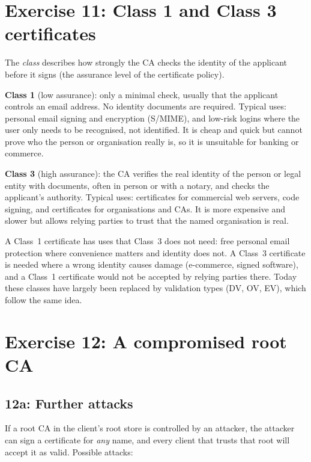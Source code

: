     \pagebreak

    \section{Exercise 11: Class 1 and Class 3 certificates}

        The \emph{class} describes how strongly the CA checks the identity of the applicant
        before it signs (the assurance level of the certificate policy).

        \textbf{Class 1} (low assurance): only a minimal check, usually that the applicant
        controls an email address. No identity documents are required. Typical uses:
        personal email signing and encryption (S/MIME), and low-risk logins where the user
        only needs to be recognised, not identified. It is cheap and quick but cannot prove
        who the person or organisation really is, so it is unsuitable for banking or commerce.

        \textbf{Class 3} (high assurance): the CA verifies the real identity of the person or
        legal entity with documents, often in person or with a notary, and checks the
        applicant's authority. Typical uses: certificates for commercial web servers, code
        signing, and certificates for organisations and CAs. It is more expensive and slower
        but allows relying parties to trust that the named organisation is real.

        A Class~1 certificate has uses that Class~3 does not need: free personal email
        protection where convenience matters and identity does not. A Class~3 certificate
        is needed where a wrong identity causes damage (e-commerce, signed software), and a
        Class~1 certificate would not be accepted by relying parties there. Today these
        classes have largely been replaced by validation types (DV, OV, EV), which follow the
        same idea.

    \pagebreak

    \section{Exercise 12: A compromised root CA}

        \subsection{12a: Further attacks}

            If a root CA in the client's root store is controlled by an attacker, the attacker
            can sign a certificate for \emph{any} name, and every client that trusts that root
            will accept it as valid. Possible attacks:

